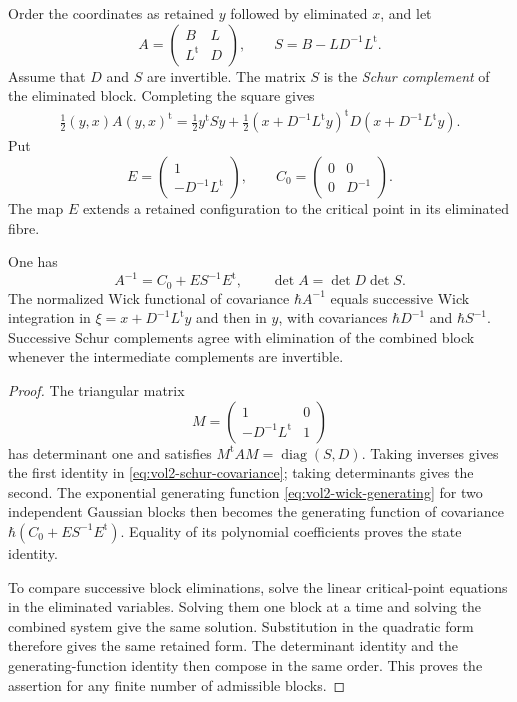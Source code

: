 Order the coordinates as retained $y$ followed by eliminated
$x$, and let
\[
 A=\begin{pmatrix}B&L\\L^{\mathrm t}&D\end{pmatrix},
 \qquad S=B-LD^{-1}L^{\mathrm t}.
\]
Assume that $D$ and $S$ are invertible. The matrix $S$ is the
\emph{Schur complement} of the eliminated block. Completing
the square gives
\begin{equation}\label{eq:vol2-schur-square}
 \begin{split}
 \tfrac12(y,x)A(y,x)^{\mathrm t}
   =\tfrac12y^{\mathrm t}Sy
    +\tfrac12(x+D^{-1}L^{\mathrm t}y)^{\mathrm t}
                         D(x+D^{-1}L^{\mathrm t}y).
 \end{split}
\end{equation}
Put
\[
 E=\begin{pmatrix}1\\-D^{-1}L^{\mathrm t}\end{pmatrix},
 \qquad
 C_0=\begin{pmatrix}0&0\\0&D^{-1}\end{pmatrix}.
\]
The map $E$ extends a retained configuration to the critical
point in its eliminated fibre.

\begin{proposition}\label{prop:vol2-schur-sewing}
One has
\begin{equation}\label{eq:vol2-schur-covariance}
 A^{-1}=C_0+ES^{-1}E^{\mathrm t},\qquad
 \det A=\det D\det S.
\end{equation}
The normalized Wick functional of covariance $\hbar A^{-1}$
equals successive Wick integration in
$\xi=x+D^{-1}L^{\mathrm t}y$ and then in $y$, with
covariances $\hbar D^{-1}$ and $\hbar S^{-1}$.
Successive Schur complements agree with elimination of the
combined block whenever the intermediate complements are
invertible.
\end{proposition}
\begin{proof}
The triangular matrix
\[
 M=\begin{pmatrix}1&0\\-D^{-1}L^{\mathrm t}&1\end{pmatrix}
\]
has determinant one and satisfies
$M^{\mathrm t}AM=\operatorname{diag}(S,D)$.
Taking inverses gives the first identity in
\eqref{eq:vol2-schur-covariance}; taking determinants gives
the second. The exponential generating function
\eqref{eq:vol2-wick-generating} for two independent Gaussian
blocks then becomes the generating function of covariance
$\hbar(C_0+ES^{-1}E^{\mathrm t})$. Equality of its polynomial
coefficients proves the state identity.

To compare successive block eliminations, solve the linear
critical-point equations in the eliminated variables. Solving
them one block at a time and solving the combined system give
the same solution. Substitution in the quadratic form therefore
gives the same retained form. The determinant identity and
the generating-function identity then compose in the same
order. This proves the assertion for any finite number of
admissible blocks.
\end{proof}

